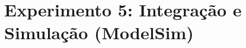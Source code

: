 \documentclass[aspectratio=169]{beamer}
\begin{document}
%
%	
%			
%			
%			
%
%	
%			
%			












\section{Experimento 5: Integração e Simulação (ModelSim)}
\end{document}
